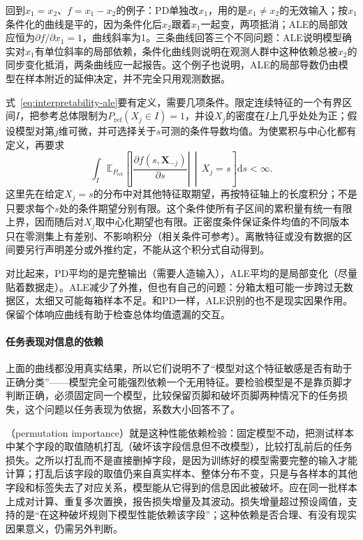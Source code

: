 回到$x_1=x_2$、$f=x_1-x_2$的例子：PD单独改$x_1$，用的是$x_1\neq x_2$的无效输入；按$x_1$条件化的曲线是平的，因为条件化后$x_2$跟着$x_1$一起变，两项抵消；ALE的局部效应恒为$\partial f/\partial x_1=1$，曲线斜率为1。三条曲线回答三个不同问题：ALE说明模型确实对$x_1$有单位斜率的局部依赖，条件化曲线则说明在观测人群中这种依赖总被$x_2$的同步变化抵消，两条曲线应一起报告。这个例子也说明，ALE的局部导数仍由模型在样本附近的延伸决定，并不完全只用观测数据。

式~\eqref{eq:interpretability-ale}要有定义，需要几项条件。限定连续特征的一个有界区间$I$，把参考总体限制为$P_{\mathrm{ref}}(X_j\in I)=1$，并设$X_j$的密度在$I$上几乎处处为正；假设模型对第$j$维可微，并可选择关于$s$可测的条件导数均值。为使累积与中心化都有定义，再要求
\[
 \int_I\mathbb E_{P_{\mathrm{ref}}}\!\left[
 \left|\frac{\partial f(s,\bm X_{-j})}{\partial s}\right|
 \,\middle|\,X_j=s\right]\mathrm ds<\infty.
\]
这里先在给定$X_j=s$的分布中对其他特征取期望，再按特征轴上的长度积分；不是只要求每个$s$处的条件期望分别有限。这个条件使所有子区间的累积量有统一有限上界，因而随后对$X_j$取中心化期望也有限。正密度条件保证条件均值的不同版本只在零测集上有差别、不影响积分（相关条件可参考）。离散特征或没有数据的区间要另行声明差分或外推约定，不能从这个积分式自动得到。

对比起来，PD平均的是完整输出（需要人造输入），ALE平均的是局部变化（尽量贴着数据走）。ALE减少了外推，但也有自己的问题：分箱太粗可能一步跨过无数据区，太细又可能每箱样本不足。和PD一样，ALE识别的也不是现实因果作用。保留个体响应曲线有助于检查总体均值遗漏的交互。

\paragraph{任务表现对信息的依赖}

上面的曲线都没用真实结果，所以它们说明不了“模型对这个特征敏感是否有助于正确分类”——模型完全可能强烈依赖一个无用特征。要检验模型是不是靠页脚才判断正确，必须固定同一个模型，比较保留页脚和破坏页脚两种情况下的任务损失，这个问题以任务表现为依据，系数大小回答不了。

（permutation importance）就是这种性能依赖检验：固定模型不动，把测试样本中某个字段的取值随机打乱（破坏该字段信息但不改模型），比较打乱前后的任务损失。之所以打乱而不是直接删掉字段，是因为训练好的模型需要完整的输入才能计算；打乱后该字段的取值仍来自真实样本、整体分布不变，只是与各样本的其他字段和标签失去了对应关系，模型能从它得到的信息因此被破坏。应在同一批样本上成对计算、重复多次置换，报告损失增量及其波动。损失增量超过预设阈值，支持的是“在这种破坏规则下模型性能依赖该字段”；这种依赖是否合理、有没有现实因果意义，仍需另外判断。

